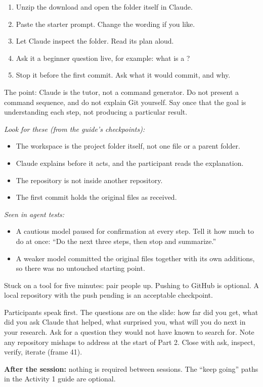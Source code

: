 \begin{enumerate}
  \item Unzip the download and open the folder itself in Claude.
  \item Paste the starter prompt. Change the wording if you like.
  \item Let Claude inspect the folder. Read its plan aloud.
  \item Ask it a beginner question live, for example: what is a ?
  \item Stop it before the first commit. Ask what it would commit, and why.
\end{enumerate}
The point: Claude is the tutor, not a command generator. Do not present a command sequence, and do not explain Git yourself. Say once that the goal is understanding each step, not producing a particular result.

\textit{Look for these (from the guide's checkpoints):}
\begin{itemize}
  \item The workspace is the project folder itself, not one file or a parent folder.
  \item Claude explains before it acts, and the participant reads the explanation.
  \item The repository is not inside another repository.
  \item The first commit holds the original files as received.
\end{itemize}
\textit{Seen in agent tests:}
\begin{itemize}
  \item A cautious model paused for confirmation at every step. Tell it how much to do at once: ``Do the next three steps, then stop and summarize.''
  \item A weaker model committed the original files together with its own additions, so there was no untouched starting point.
\end{itemize}
Stuck on a tool for five minutes: pair people up. Pushing to GitHub is optional. A local repository with the push pending is an acceptable checkpoint.

Participants speak first. The questions are on the slide: how far did you get, what did you ask Claude that helped, what surprised you, what will you do next in your research. Ask for a question they would not have known to search for. Note any repository mishaps to address at the start of Part 2. Close with ask, inspect, verify, iterate (frame 41).

\vfill
\textbf{After the session:} nothing is required between sessions. The ``keep going'' paths in the Activity 1 guide are optional.

